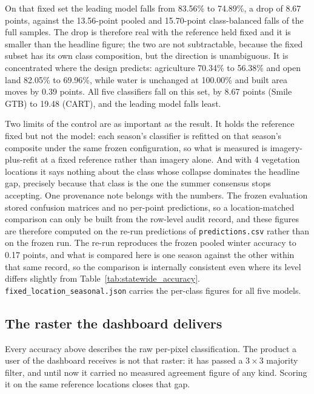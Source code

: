 \documentclass[conference]{IEEEtran}
\begin{document}
On that fixed set the leading model falls from 83.56\% to 74.89\%, a drop of 8.67 points, against the 13.56-point pooled and 15.70-point class-balanced falls of the full samples. The drop is therefore real with the reference held fixed and it is smaller than the headline figure; the two are not subtractable, because the fixed subset has its own class composition, but the direction is unambiguous. It is concentrated where the design predicts: agriculture 70.34\% to 56.38\% and open land 82.05\% to 69.96\%, while water is unchanged at 100.00\% and built area moves by 0.39 points. All five classifiers fall on this set, by 8.67 points (Smile GTB) to 19.48 (CART), and the leading model falls least.

Two limits of the control are as important as the result. It holds the reference fixed but not the model: each season's classifier is refitted on that season's composite under the same frozen configuration, so what is measured is imagery-plus-refit at a fixed reference rather than imagery alone. And with 4 vegetation locations it says nothing about the class whose collapse dominates the headline gap, precisely because that class is the one the summer consensus stops accepting. One provenance note belongs with the numbers. The frozen evaluation stored confusion matrices and no per-point predictions, so a location-matched comparison can only be built from the row-level audit record, and these figures are therefore computed on the re-run predictions of \texttt{predictions.csv} rather than on the frozen run. The re-run reproduces the frozen pooled winter accuracy to 0.17 points, and what is compared here is one season against the other within that same record, so the comparison is internally consistent even where its level differs slightly from Table~\ref{tab:statewide_accuracy}. \texttt{fixed\_location\_seasonal.json} carries the per-class figures for all five models.

\subsection{The raster the dashboard delivers}
\label{sec:delivered}
Every accuracy above describes the raw per-pixel classification. The product a user of the dashboard receives is not that raster: it has passed a $3\times3$ majority filter, and until now it carried no measured agreement figure of any kind. Scoring it on the same reference locations closes that gap.
\end{document}
